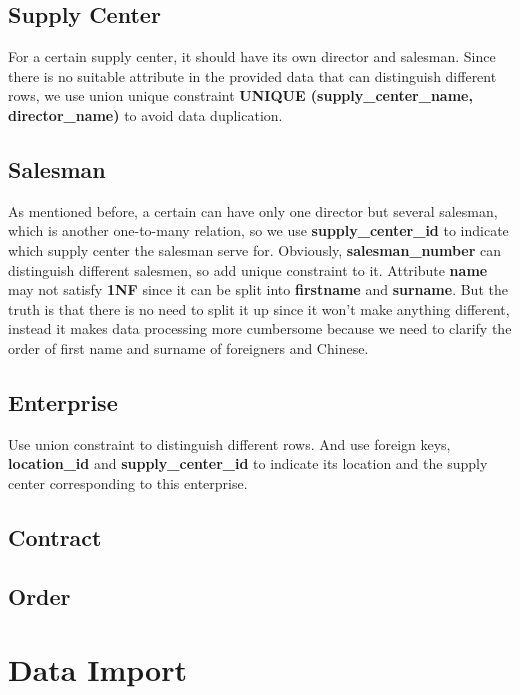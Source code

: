 \documentclass[onecolumn, oneside, ctexart, UTF8, b4paper]{SUSTechHomework}
\begin{document}
\subsection{\textbf{Supply Center}}
For a certain supply center, it should have its own director and salesman. Since there is no suitable attribute in the provided data that can distinguish different rows, we use union unique constraint \textbf{UNIQUE (supply\_center\_name, director\_name)} to avoid data duplication.

\subsection{\textbf{Salesman}}
As mentioned before, a certain can have only one director but several salesman, which is another one-to-many relation, so we use \textbf{supply\_center\_id} to indicate which supply center the salesman serve for. Obviously, \textbf{salesman\_number} can distinguish different salesmen, so add unique constraint to it. Attribute \textbf{name} may not satisfy \textbf{1NF} since it can be split into \textbf{firstname} and \textbf{surname}. But the truth is that there is no need to split it up since it won't make anything different, instead it makes data processing more cumbersome because we need to clarify the order of first name and surname of foreigners and Chinese.

\subsection{\textbf{Enterprise}}
Use union constraint to distinguish different rows. And use foreign keys, \textbf{location\_id} and \textbf{supply\_center\_id} to indicate its location and the supply center corresponding to this enterprise.

\subsection{\textbf{Contract}}


\subsection{\textbf{Order}}





\section{Data Import}
\end{document}
